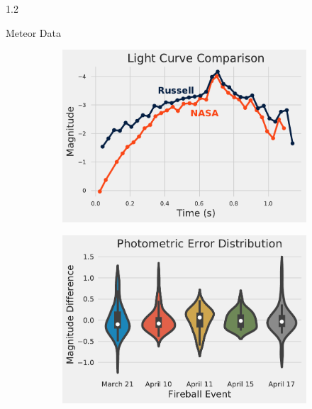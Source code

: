 \documentclass[final]{beamer}
\newlength{\twocolwid}
\begin{document}
\begin{frame}[t]
\begin{columns}[t]
\begin{column}{1.2\twocolwid}
\begin{alertblock}{Meteor Data}
\begin{figure}
\centering
\begin{subfigure}{.5\textwidth}
  \centering
  \includegraphics[height=.7\linewidth]{PosterGraph.pdf}
  \label{fig:sub1}
\end{subfigure}%
\begin{subfigure}{.5\textwidth}
  \centering
  \includegraphics[height=.7\linewidth]{theviolinplot.pdf}
  \label{fig:sub2}
\end{subfigure}
\label{fig:test}
\end{figure}
\vspace{-1.5cm}
\end{alertblock}





\end{column}
\end{columns}
\end{frame}
\end{document}
